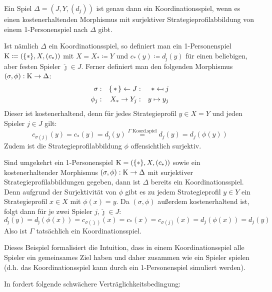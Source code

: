 \begin{bsp}\label{bsp:Koordinationsspiel}
	Ein Spiel $\Delta = (J, Y, (d_j))$ ist genau dann ein Koordinationsspiel, wenn es einen kostenerhaltenden Morphismus mit surjektiver Strategieprofilabbildung von einem 1-Personenspiel nach $\Delta$ gibt.
	
	Ist nämlich $\Delta$ ein Koordinationsspiel, so definiert man ein 1-Personenspiel $\mathrm{K} \coloneqq (\{\ast\}, X, (c_\ast))$ mit $X = X_\ast \coloneqq Y$ und $c_\ast(y) \coloneqq d_{\hat{\jmath}}(y)$ für einen beliebigen, aber festen Spieler $\hat{\jmath} \in J$. Ferner definiert man den folgenden Morphismus $(\sigma, \phi): \mathrm{K} \to \Delta$:
	\begin{align*}
		\sigma:	&&\set{\ast}\leftarrow J:	&&\ast	\mapsfrom	j  \\
		\phi_j:	&&X_\ast	\to	 Y_j:	&&y		\mapsto		y_j
	\end{align*}	
	Dieser ist kostenerhaltend, denn für jedes Strategieprofil $y \in X = Y$ und jeden Spieler $j \in J$ gilt:
	\[c_{\sigma(j)}(y) = c_\ast(y) = d_{\hat{\jmath}}(y) \overset{\Gamma \text{ Koord.spiel}}{=} d_j(y) = d_j(\phi(y))\]
	Zudem ist die Strategieprofilabbildung $\phi$ offensichtlich surjektiv.
	
	Sind umgekehrt ein 1-Personenspiel $\mathrm{K} = (\{\ast\}, X, (c_\ast))$ sowie ein kostenerhaltender Morphismus  $(\sigma, \phi): \mathrm{K} \to \Delta$ mit surjektiver Strategieprofilabbildungen gegeben, dann ist $\Delta$ bereits ein Koordinationsspiel. Denn aufgrund der Surjektivität von $\phi$ gibt es zu jedem Strategieprofil $y \in Y$ ein Strategieprofil $x \in X$ mit $\phi(x) = y$. Da $(\sigma, \phi)$ außerdem kostenerhaltend ist, folgt dann für je zwei Spieler $j, \hat{\jmath} \in J$: 
		\[d_{\hat{\jmath}}(y) = d_{\hat{\jmath}}(\phi(x)) = c_{\sigma(\hat{\jmath})}(x) = c_\ast(x) = c_{\sigma(j)}(x) = d_j(\phi(x)) = d_j(y)\]
	Also ist $\Gamma$ tatsächlich ein Koordinationsspiel.
\end{bsp}

Dieses Beispiel formalisiert die Intuition, dass in einem Koordinationsspiel alle Spieler ein gemeinsames Ziel haben und daher zusammen \glqq wie ein Spieler\grqq{} spielen (d.h. das Koordinationsspiel kann durch ein 1-Personenspiel simuliert werden).

%	

In \cite[Definition 4.1]{LapGameCat} fordert \citeauthor{LapGameCat} folgende schwächere Verträglichkeitsbedingung:

